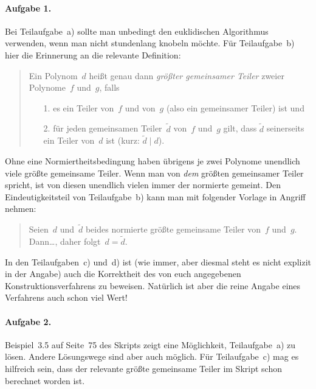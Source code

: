 \documentclass{../algblatt}
\begin{document}
\paragraph{Aufgabe 1.} Bei Teilaufgabe~a) sollte man unbedingt den euklidischen
Algorithmus verwenden, wenn man nicht stundenlang knobeln möchte. Für
Teilaufgabe~b) hier die Erinnerung an die relevante Definition:
\begin{quote}Ein Polynom~$d$ heißt genau dann \emph{größter gemeinsamer Teiler}
zweier Polynome~$f$ und~$g$, falls
\begin{enumerate}
\item[1.] es ein Teiler von~$f$ und von~$g$ (also ein gemeinsamer Teiler) ist und
\item[2.] für jeden gemeinsamen Teiler~$\widetilde d$ von~$f$ und~$g$ gilt,
dass $\widetilde d$ seinerseits ein Teiler
von~$d$ ist (kurz: $\widetilde d \mid d$).
\end{enumerate}
\end{quote}
Ohne eine Normiertheitsbedingung haben übrigens je zwei Polynome unendlich
viele größte gemeinsame Teiler. Wenn man von \emph{dem} größten gemeinsamer
Teiler spricht, ist von diesen unendlich vielen immer der normierte gemeint.
Den Eindeutigkeitsteil von Teilaufgabe~b) kann man mit folgender Vorlage in
Angriff nehmen:
\begin{quote}Seien~$d$ und~$\widetilde d$ beides normierte größte gemeinsame
Teiler von~$f$ und~$g$. Dann\ldots, daher folgt~$d = \widetilde d$.\end{quote}
In den Teilaufgaben~c) und~d) ist (wie immer, aber diesmal steht es nicht
explizit in der Angabe) auch die Korrektheit des von euch angegebenen
Konstruktionsverfahrens zu beweisen. Natürlich ist aber die reine Angabe eines
Verfahrens auch schon viel Wert!

\paragraph{Aufgabe 2.} Beispiel~3.5 auf Seite~75 des Skripts zeigt eine
Möglichkeit, Teilaufgabe~a) zu lösen. Andere Lösungswege sind aber auch
möglich. Für Teilaufgabe~c) mag es hilfreich sein, dass der relevante größte
gemeinsame Teiler im Skript schon berechnet worden ist.
\end{document}

